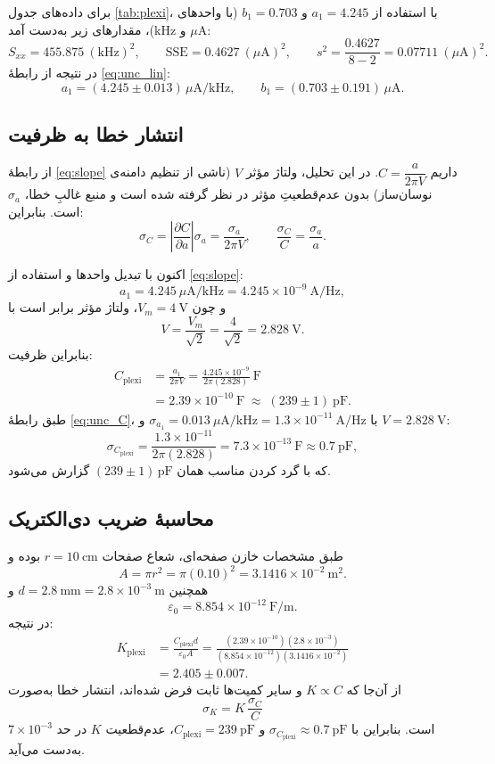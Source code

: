 \documentclass[a4paper, 11pt]{article}
\begin{document}
برای داده‌های جدول \ref{tab:plexi}، با استفاده از \(a_1=4.245\) و \(b_1=0.703\) (با واحدهای \(\mu\mathrm{A}\) و \(\mathrm{kHz}\))، مقدارهای زیر به‌دست آمد:
\[
S_{xx}=455.875~(\mathrm{kHz})^2,\qquad
\mathrm{SSE}=0.4627~(\mu\mathrm{A})^2,\qquad
s^2=\frac{0.4627}{8-2}=0.07711~(\mu\mathrm{A})^2.
\]
در نتیجه از رابطهٔ \eqref{eq:unc_lin}:
\[
a_1=(4.245\pm 0.013)\,\mu\mathrm{A/kHz},
\qquad
b_1=(0.703\pm 0.191)\,\mu\mathrm{A}.
\]

\subsection*{انتشار خطا به ظرفیت}
از رابطهٔ \eqref{eq:slope} داریم \(C=\dfrac{a}{2\pi V}\). در این تحلیل، ولتاژ مؤثر \(V\) (ناشی از تنظیم دامنه‌ی نوسان‌ساز) بدون عدم‌قطعیتِ مؤثر در نظر گرفته شده است و منبع غالبِ خطا، \(\sigma_a\) است. بنابراین:
\begin{equation}
\sigma_C=\left|\frac{\partial C}{\partial a}\right|\sigma_a=\frac{\sigma_a}{2\pi V},
\qquad
\frac{\sigma_C}{C}=\frac{\sigma_a}{a}.
\label{eq:unc_C}
\end{equation}


اکنون با تبدیل واحدها و استفاده از \eqref{eq:slope}:
\[
a_1 = 4.245~\mu\mathrm{A/kHz} = 4.245\times 10^{-9}~\mathrm{A/Hz},
\]
و چون $V_m=4~\mathrm{V}$، ولتاژ مؤثر برابر است با
\[
V=\frac{V_m}{\sqrt{2}}=\frac{4}{\sqrt{2}}=2.828~\mathrm{V}.
\]
بنابراین ظرفیت:
\begin{align}
C_{\mathrm{plexi}} &= \frac{a_1}{2\pi V}
= \frac{4.245\times 10^{-9}}{2\pi(2.828)} \ \mathrm{F} \nonumber\\
&=2.39\times 10^{-10}\ \mathrm{F}
\;\approx\; (239\pm 1)\ \mathrm{pF}.
\end{align}
طبق رابطهٔ \eqref{eq:unc_C}، با \(\sigma_{a_1}=0.013~\mu\mathrm{A/kHz}=1.3\times 10^{-11}~\mathrm{A/Hz}\) و \(V=2.828~\mathrm{V}\):
\[
\sigma_{C_{\mathrm{plexi}}}=\frac{1.3\times 10^{-11}}{2\pi(2.828)}=7.3\times 10^{-13}\ \mathrm{F}\approx 0.7~\mathrm{pF},
\]
که با گرد کردن مناسب همان \((239\pm 1)\,\mathrm{pF}\) گزارش می‌شود.



\subsection*{محاسبهٔ ضریب دی‌الکتریک}

طبق مشخصات خازن صفحه‌ای، شعاع صفحات $r=10~\mathrm{cm}$ بوده و
\[
A=\pi r^2=\pi(0.10)^2=3.1416\times 10^{-2}\ \mathrm{m^2}.
\]
همچنین $d=2.8~\mathrm{mm}=2.8\times 10^{-3}\ \mathrm{m}$ و
\[
\varepsilon_0 = 8.854\times 10^{-12}\ \mathrm{F/m}.
\]
در نتیجه:
\begin{align}
K_{\mathrm{plexi}} &= \frac{C_{\mathrm{plexi}} d}{\varepsilon_0 A}
= \frac{(2.39\times 10^{-10})(2.8\times 10^{-3})}
{(8.854\times 10^{-12})(3.1416\times 10^{-2})} \nonumber\\
&= 2.405 \pm 0.007.
\end{align}
از آن‌جا که \(K\propto C\) و سایر کمیت‌ها ثابت فرض شده‌اند، انتشار خطا به‌صورت
\[
\sigma_K = K\,\frac{\sigma_C}{C}
\]
است. بنابراین با \(\sigma_{C_{\mathrm{plexi}}}\approx 0.7~\mathrm{pF}\) و \(C_{\mathrm{plexi}}=239~\mathrm{pF}\)، عدم‌قطعیت \(K\) در حد \(7\times 10^{-3}\) به‌دست می‌آید.
\end{document}
